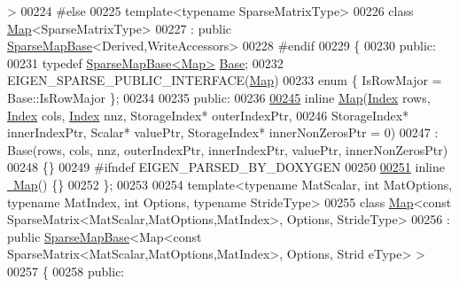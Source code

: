 \begin{DoxyCode}
       >
00224 \textcolor{preprocessor}{#else}
00225 template<typename SparseMatrixType>
00226 class \hyperlink{group___core___module_class_eigen_1_1_map}{Map}<SparseMatrixType>
00227   : \textcolor{keyword}{public} \hyperlink{class_eigen_1_1_sparse_map_base}{SparseMapBase}<Derived,WriteAccessors>
00228 \textcolor{preprocessor}{#endif}
00229 \{
00230   \textcolor{keyword}{public}:
00231     \textcolor{keyword}{typedef} \hyperlink{class_eigen_1_1_sparse_map_base}{SparseMapBase<Map>} \hyperlink{group___sparse_core___module_class_eigen_1_1_sparse_matrix_base}{Base};
00232     EIGEN\_SPARSE\_PUBLIC\_INTERFACE(\hyperlink{group___core___module_class_eigen_1_1_map}{Map})
00233     \textcolor{keyword}{enum} \{ IsRowMajor = Base::IsRowMajor \};
00234 
00235   \textcolor{keyword}{public}:
00236 
\hyperlink{group___sparse_core___module_a634ffe6952d21716ca879e107f620f19}{00245}     \textcolor{keyword}{inline} \hyperlink{group___sparse_core___module_a634ffe6952d21716ca879e107f620f19}{Map}(\hyperlink{namespace_eigen_a62e77e0933482dafde8fe197d9a2cfde}{Index} rows, \hyperlink{namespace_eigen_a62e77e0933482dafde8fe197d9a2cfde}{Index} cols, \hyperlink{namespace_eigen_a62e77e0933482dafde8fe197d9a2cfde}{Index} nnz, StorageIndex* outerIndexPtr,
00246                StorageIndex* innerIndexPtr, Scalar* valuePtr, StorageIndex* innerNonZerosPtr = 0)
00247       : Base(rows, cols, nnz, outerIndexPtr, innerIndexPtr, valuePtr, innerNonZerosPtr)
00248     \{\}
00249 \textcolor{preprocessor}{#ifndef EIGEN\_PARSED\_BY\_DOXYGEN}
00250 
\hyperlink{group___sparse_core___module_a4d2900fdd8c973d24c4cfb0f0ee4f53f}{00251}     \textcolor{keyword}{inline} \hyperlink{group___sparse_core___module_a4d2900fdd8c973d24c4cfb0f0ee4f53f}{~Map}() \{\}
00252 \};
00253 
00254 \textcolor{keyword}{template}<\textcolor{keyword}{typename} MatScalar, \textcolor{keywordtype}{int} MatOptions, \textcolor{keyword}{typename} MatIndex, \textcolor{keywordtype}{int} Options, \textcolor{keyword}{typename} Str\textcolor{keywordtype}{id}eType>
00255 \textcolor{keyword}{class }\hyperlink{group___core___module_class_eigen_1_1_map}{Map}<const SparseMatrix<MatScalar,MatOptions,MatIndex>, Options, StrideType>
00256   : \textcolor{keyword}{public} \hyperlink{class_eigen_1_1_sparse_map_base}{SparseMapBase}<Map<const SparseMatrix<MatScalar,MatOptions,MatIndex>, Options, Strid
      eType> >
00257 \{
00258   \textcolor{keyword}{public}:

\end{DoxyCode}

